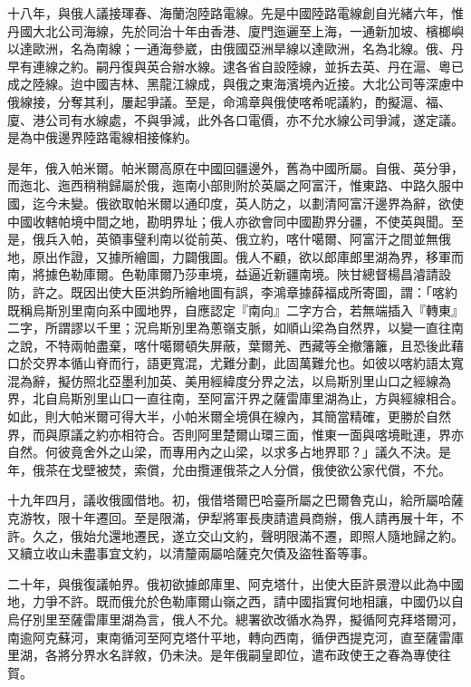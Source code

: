 \begin{pinyinscope}
十八年，與俄人議接琿春、海蘭泡陸路電線。先是中國陸路電線創自光緒六年，惟丹國大北公司海線，先於同治十年由香港、廈門迤邐至上海，一通新加坡、檳榔嶼以達歐洲，名為南線；一通海參崴，由俄國亞洲旱線以達歐洲，名為北線。俄、丹早有連線之約。嗣丹復與英合辦水線。逮各省自設陸線，並拆去英、丹在滬、粵已成之陸線。迨中國吉林、黑龍江線成，與俄之東海濱境內近接。大北公司等深慮中俄線接，分奪其利，屢起爭議。至是，命鴻章與俄使喀希呢議約，酌擬滬、福、廈、港公司有水線處，不與爭減，此外各口電價，亦不允水線公司爭減，遂定議。是為中俄邊界陸路電線相接條約。

是年，俄入帕米爾。帕米爾高原在中國回疆邊外，舊為中國所屬。自俄、英分爭，而迤北、迤西稍稍歸屬於俄，迤南小部則附於英屬之阿富汗，惟東路、中路久服中國，迄今未變。俄欲取帕米爾以通印度，英人防之，以劃清阿富汗邊界為辭，欲使中國收轄帕境中間之地，勘明界址；俄人亦欲會同中國勘界分疆，不使英與聞。至是，俄兵入帕，英領事璧利南以從前英、俄立約，喀什噶爾、阿富汗之間並無俄地，原出作證，又據所繪圖，力闢俄圖。俄人不顧，欲以郎庫郎里湖為界，移軍而南，將據色勒庫爾。色勒庫爾乃莎車境，益逼近新疆南境。陜甘總督楊昌濬請設防，許之。既因出使大臣洪鈞所繪地圖有誤，李鴻章據薛福成所寄圖，謂：「喀約既稱烏斯別里南向系中國地界，自應認定『南向』二字方合，若無端插入『轉東』二字，所謂謬以千里；況烏斯別里為蔥嶺支脈，如順山梁為自然界，以變一直往南之說，不特兩帕盡棄，喀什噶爾頓失屏蔽，葉爾羌、西藏等全撤籓籬，且恐後此藉口於交界本循山脊而行，語更寬混，尤難分劃，此固萬難允也。如彼以喀約語太寬混為辭，擬仿照北亞墨利加英、美用經緯度分界之法，以烏斯別里山口之經線為界，北自烏斯別里山口一直往南，至阿富汗界之薩雷庫里湖為止，方與經線相合。如此，則大帕米爾可得大半，小帕米爾全境俱在線內，其簡當精確，更勝於自然界，而與原議之約亦相符合。否則阿里楚爾山環三面，惟東一面與喀境毗連，界亦自然。何彼竟舍外之山梁，而專用內之山梁，以求多占地界耶？」議久不決。是年，俄茶在戈壁被焚，索償，允由攬運俄茶之人分償，俄使欲公家代償，不允。

十九年四月，議收俄國借地。初，俄借塔爾巴哈臺所屬之巴爾魯克山，給所屬哈薩克游牧，限十年遷回。至是限滿，伊犁將軍長庚請遣員商辦，俄人請再展十年，不許。久之，俄始允還地遷民，遂立交山文約，聲明限滿不遷，即照人隨地歸之約。又續立收山未盡事宜文約，以清釐兩屬哈薩克欠債及盜牲畜等事。

二十年，與俄復議帕界。俄初欲據郎庫里、阿克塔什，出使大臣許景澄以此為中國地，力爭不許。既而俄允於色勒庫爾山嶺之西，請中國指實何地相讓，中國仍以自烏仔別里至薩雷庫里湖為言，俄人不允。總署欲改循水為界，擬循阿克拜塔爾河，南逾阿克蘇河，東南循河至阿克塔什平地，轉向西南，循伊西提克河，直至薩雷庫里湖，各將分界水名詳敘，仍未決。是年俄嗣皇即位，遣布政使王之春為專使往賀。


\end{pinyinscope}
